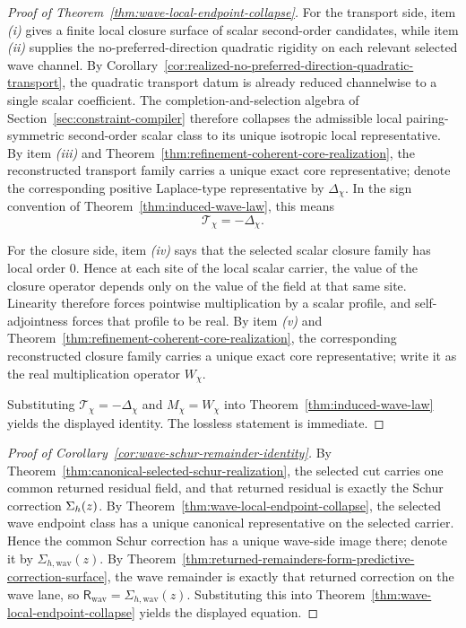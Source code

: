 \begin{proof}[Proof of Theorem~\ref{thm:wave-local-endpoint-collapse}]
\label{proof:thm:wave-local-endpoint-collapse}
For the transport side, item \emph{(i)} gives a finite local closure surface
of scalar second-order candidates, while item \emph{(ii)} supplies the
no-preferred-direction quadratic rigidity on each relevant selected wave
channel. By Corollary~\ref{cor:realized-no-preferred-direction-quadratic-transport},
the quadratic transport datum is already reduced channelwise to a single scalar
coefficient. The completion-and-selection algebra of
Section~\ref{sec:constraint-compiler} therefore collapses the admissible local
pairing-symmetric second-order scalar class to its unique isotropic local
representative. By item \emph{(iii)} and
Theorem~\ref{thm:refinement-coherent-core-realization}, the reconstructed
transport family carries a unique exact core representative; denote the corresponding
positive Laplace-type representative by \(\Delta_{\chi}\). In the sign
convention of Theorem~\ref{thm:induced-wave-law}, this means
\[
\mathcal T_{\chi}=-\Delta_{\chi}.
\]

For the closure side, item \emph{(iv)} says that the selected scalar closure
family has local order \(0\). Hence at each site of the local scalar carrier,
the value of the closure operator depends only on the value of the field at
that same site. Linearity therefore forces pointwise multiplication by a scalar
profile, and self-adjointness forces that profile to be real. By item
\emph{(v)} and Theorem~\ref{thm:refinement-coherent-core-realization}, the
corresponding reconstructed closure family carries a unique exact core
representative; write it as the real multiplication operator \(W_{\chi}\).

Substituting \(\mathcal T_{\chi}=-\Delta_{\chi}\) and \(M_{\chi}=W_{\chi}\)
into Theorem~\ref{thm:induced-wave-law} yields the displayed identity. The
lossless statement is immediate.
\end{proof}

\begin{proof}[Proof of Corollary~\ref{cor:wave-schur-remainder-identity}]
\label{proof:cor:wave-schur-remainder-identity}
By Theorem~\ref{thm:canonical-selected-schur-realization}, the selected cut
carries one common returned residual field, and that returned residual is
exactly the Schur correction \(\Sigma_{h}(z)\). By
Theorem~\ref{thm:wave-local-endpoint-collapse}, the selected wave endpoint
class has a unique canonical representative on the selected carrier. Hence the
common Schur correction has a unique wave-side image there; denote it by
\(\Sigma_{h,\mathrm{wav}}(z)\). By
Theorem~\ref{thm:returned-remainders-form-predictive-correction-surface}, the
wave remainder is exactly that returned correction on the wave lane, so
\(\mathsf R_{\mathrm{wav}}=\Sigma_{h,\mathrm{wav}}(z)\). Substituting this into
Theorem~\ref{thm:wave-local-endpoint-collapse} yields the displayed equation.
\end{proof}


